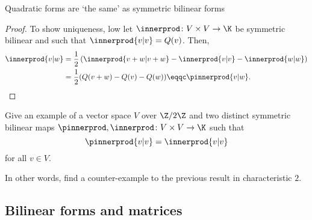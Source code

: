 \begin{thm}{Quadratic forms are `the same' as symmetric bilinear forms}{}
\begin{proof}
		To show uniqueness, low let $\innerprod \colon V\times V\rightarrow \K$ be symmetric bilinear and such that $\innerprod{v|v}=Q(v)$.  Then,
		\begin{equation}
			\begin{split}
				\innerprod{v|w} & =\frac{1}{2}\left( \innerprod{v+w|v+w}-\innerprod{v|v}-\innerprod{w|w}\right) \\
				& =\frac{1}{2}(Q(v+w)-Q(v)-Q(w))\eqqc \pinnerprod{v|w}.
			\end{split}
		\end{equation}
	\end{proof}
\end{thm}
\begin{exr}{}{}
	Give an example of a vector space $V$ over $\Z /2\Z$ and two distinct symmetric bilinear maps $\pinnerprod ,\innerprod \colon V\times V\rightarrow \K$ such that
	\begin{equation}
		\pinnerprod{v|v}=\innerprod{v|v}
	\end{equation}
	for all $v\in V$.
	\begin{rmk}
		In other words, find a counter-example to the previous result in characteristic $2$.
	\end{rmk}
\end{exr}

\subsection{Bilinear forms and matrices}

